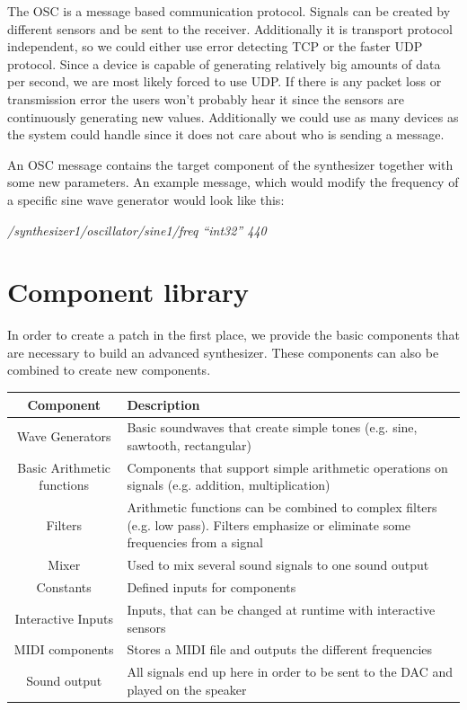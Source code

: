 The \ac{OSC} is a message based communication protocol. 
Signals can be created by different sensors and be sent to the receiver. 
Additionally it is transport protocol independent, so we could either use error detecting TCP or the faster UDP protocol. 
Since a device is capable of generating relatively big amounts of data per second, we are most likely forced to use UDP. 
If there is any packet loss or transmission error the users won't probably hear it since the sensors are continuously generating new values. 
Additionally we could use as many devices as the system could handle since it does not care about who is sending a message.

An \ac{OSC} message contains the target component of the synthesizer together with some new parameters. 
An example message, which would modify the frequency of a specific sine wave generator would look like this: 

\emph{/synthesizer1/oscillator/sine1/freq “int32” 440} \\


\section{Component library}
In order to create a patch in the first place, we provide the basic components that are necessary to build an advanced synthesizer. 
These components can also be combined to create new components.



	 \begin{tabular}[h]{|c|p{9.75cm}|}
	  \hline
	  Component & Description \\
	  \hline
	  \hline
	  Wave Generators & Basic soundwaves that create simple tones (e.g. sine, sawtooth, rectangular) \\\hline
		Basic Arithmetic functions & Components that support simple arithmetic operations on signals (e.g. addition, multiplication)\\\hline
		Filters & Arithmetic functions can be combined to complex filters (e.g. low pass). Filters emphasize or eliminate some frequencies from a signal \\\hline
		Mixer & Used to mix several sound signals to one sound output \\\hline
		Constants & Defined inputs for components \\\hline
		Interactive Inputs & Inputs, that can be changed at runtime with interactive sensors \\\hline
		MIDI components & Stores a MIDI file and outputs the different frequencies \\\hline
		Sound output & All signals end up here in order to be sent to the \ac{DAC} and played on the speaker \\\hline
	 \end{tabular}
\\\\


